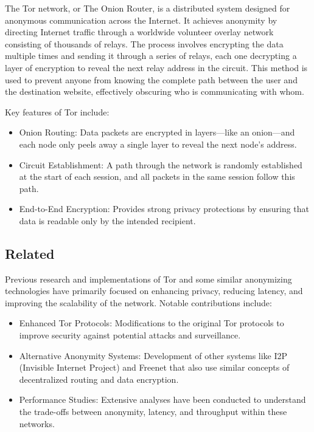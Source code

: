 \documentclass[sigconf]{acmart}
\begin{document}
The Tor network, or The Onion Router, is a distributed system designed for anonymous communication across the Internet. It achieves anonymity by directing Internet traffic through a worldwide volunteer overlay network consisting of thousands of relays. The process involves encrypting the data multiple times and sending it through a series of relays, each one decrypting a layer of encryption to reveal the next relay address in the circuit. This method is used to prevent anyone from knowing the complete path between the user and the destination website, effectively obscuring who is communicating with whom.

Key features of Tor include:
\begin{itemize}
    \item Onion Routing: Data packets are encrypted in layers—like an onion—and each node only peels away a single layer to reveal the next node's address.
    \item Circuit Establishment: A path through the network is randomly established at the start of each session, and all packets in the same session follow this path.
    \item End-to-End Encryption: Provides strong privacy protections by ensuring that data is readable only by the intended recipient.
\end{itemize}

\subsection{Related}

Previous research and implementations of Tor and some similar anonymizing technologies have primarily focused on enhancing privacy, reducing latency, and improving the scalability of the network. Notable contributions include:
\begin{itemize}
    \item Enhanced Tor Protocols: Modifications to the original Tor protocols to improve security against potential attacks and surveillance.
    \item Alternative Anonymity Systems: Development of other systems like I2P (Invisible Internet Project) and Freenet that also use similar concepts of decentralized routing and data encryption.
    \item Performance Studies: Extensive analyses have been conducted to understand the trade-offs between anonymity, latency, and throughput within these networks.
\end{itemize}
\end{document}

